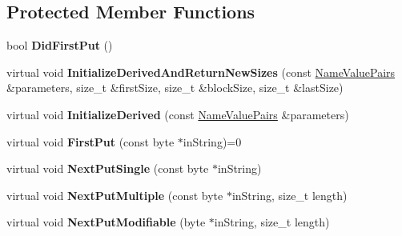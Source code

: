 \subsection*{Protected Member Functions}
\begin{DoxyCompactItemize}
\item 
\hypertarget{class_filter_with_buffered_input_a9021ea73725cb33497a754d758c888c7}{
bool {\bfseries DidFirstPut} ()}
\label{class_filter_with_buffered_input_a9021ea73725cb33497a754d758c888c7}

\item 
\hypertarget{class_filter_with_buffered_input_a5fba4d91d6349ecf1036c1aeb21d5e96}{
virtual void {\bfseries InitializeDerivedAndReturnNewSizes} (const \hyperlink{class_name_value_pairs}{NameValuePairs} \&parameters, size\_\-t \&firstSize, size\_\-t \&blockSize, size\_\-t \&lastSize)}
\label{class_filter_with_buffered_input_a5fba4d91d6349ecf1036c1aeb21d5e96}

\item 
\hypertarget{class_filter_with_buffered_input_a3ec70bc40d20c59bf2e9e48f426cea9c}{
virtual void {\bfseries InitializeDerived} (const \hyperlink{class_name_value_pairs}{NameValuePairs} \&parameters)}
\label{class_filter_with_buffered_input_a3ec70bc40d20c59bf2e9e48f426cea9c}

\item 
\hypertarget{class_filter_with_buffered_input_ad1d8f20607a52b8ae262ccb3e5a65f01}{
virtual void {\bfseries FirstPut} (const byte $\ast$inString)=0}
\label{class_filter_with_buffered_input_ad1d8f20607a52b8ae262ccb3e5a65f01}

\item 
\hypertarget{class_filter_with_buffered_input_aea864f9148947328c18fab2e17603d61}{
virtual void {\bfseries NextPutSingle} (const byte $\ast$inString)}
\label{class_filter_with_buffered_input_aea864f9148947328c18fab2e17603d61}

\item 
\hypertarget{class_filter_with_buffered_input_a03b282731e4f94fd027a0dd30abe4025}{
virtual void {\bfseries NextPutMultiple} (const byte $\ast$inString, size\_\-t length)}
\label{class_filter_with_buffered_input_a03b282731e4f94fd027a0dd30abe4025}

\item 
\hypertarget{class_filter_with_buffered_input_a3176a4422a073fa15ed7807f781704b4}{
virtual void {\bfseries NextPutModifiable} (byte $\ast$inString, size\_\-t length)}
\label{class_filter_with_buffered_input_a3176a4422a073fa15ed7807f781704b4}


\end{DoxyCompactItemize}

